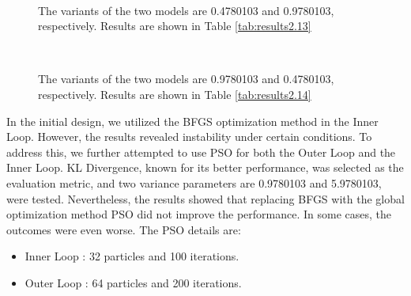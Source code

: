 \documentclass[12pt, a4paper]{article}
\begin{document}
\begin{figure}[H]
\centering
{}
\\
\caption{The variants of the two models are 0.4780103 and 0.9780103, respectively. Results are shown in Table \ref{tab:results2.13}}
\label{fig:s1=0.47,s2=0.97,13,ww}
\end{figure}




\begin{figure}[H]
\centering
{}
\\
\caption{The variants of the two models are 0.9780103 and 0.4780103, respectively. Results are shown in Table \ref{tab:results2.14}}
\label{fig:s1=0.97,s2=0.47,14,ww}
\end{figure}



\newpage








In the initial design, we utilized the BFGS optimization method in the Inner Loop. However, the results revealed instability under certain conditions. To address this, we further attempted to use PSO for both the Outer Loop and the Inner Loop. KL Divergence, known for its better performance, was selected as the evaluation metric, and two variance parameters are 0.9780103 and 5.9780103, were tested. Nevertheless, the results showed that replacing BFGS with the global optimization method PSO did not improve the performance. In some cases, the outcomes were even worse. The PSO details are:
\begin{itemize}
\item Inner Loop : 32 particles and 100 iterations.
\item Outer Loop : 64 particles and 200 iterations.
\end{itemize}
\end{document}
